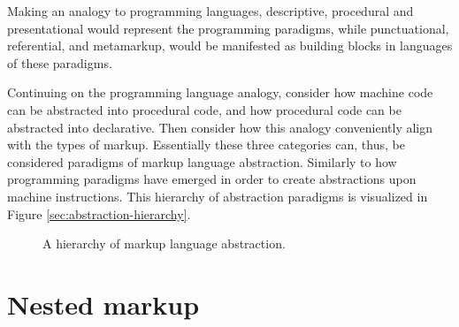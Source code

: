 \documentclass{scrreprt}
\begin{document}
Making an analogy to programming languages, descriptive, procedural and presentational would represent the programming paradigms, while punctuational, referential, and metamarkup, would be manifested as building blocks in languages of these paradigms.

Continuing on the programming language analogy, consider how machine code can be abstracted into procedural code, and how procedural code can be abstracted into declarative. Then consider how this analogy conveniently align with the types of markup. Essentially these three categories can, thus, be considered paradigms of markup language abstraction. Similarly to how programming paradigms have emerged in order to create abstractions upon machine instructions. This hierarchy of abstraction paradigms is visualized in Figure \ref{sec:abstraction-hierarchy}.


\begin{figure}[h]
\centering


\caption{A hierarchy of markup language abstraction.}
\label{fig:markup-types-hierarchy}
\end{figure}













\section{Nested markup}
\label{sec:nesting}
\end{document}
